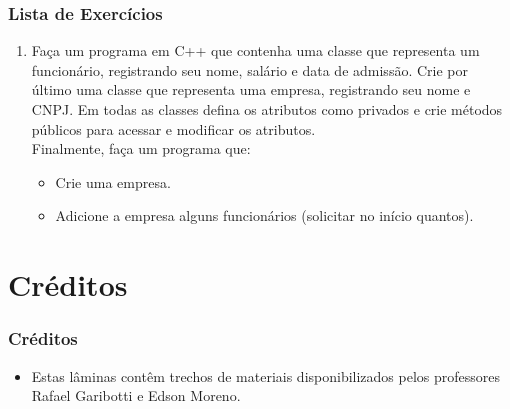 \documentclass[aspectratio=169]{beamer}
\newcommand\setItemnumber[1]{\setcounter{enumi}{\numexpr#1-1\relax}}
\begin{document}
\begin{frame}[fragile]\frametitle{Lista de Exercícios}
\begin{enumerate}
	\setItemnumber{2}
	\item Faça um programa em C++ que contenha uma classe que representa um funcionário, registrando seu nome, salário e data de admissão. Crie por último uma classe que representa uma empresa, registrando seu nome e CNPJ. Em todas as classes defina os atributos como privados e crie métodos públicos para acessar e modificar os atributos.\\
	Finalmente, faça um programa que:
	\begin{itemize}
		\item Crie uma empresa.
		\item Adicione a empresa alguns funcionários (solicitar no início quantos).
	\end{itemize}
\end{enumerate}
\end{frame}


\section{Créditos}

\begin{frame}\frametitle{Créditos}
\begin{itemize}
	\item Estas lâminas contêm trechos de materiais disponibilizados pelos professores Rafael Garibotti e Edson Moreno.
\end{itemize}
\end{frame}

\end{document}
